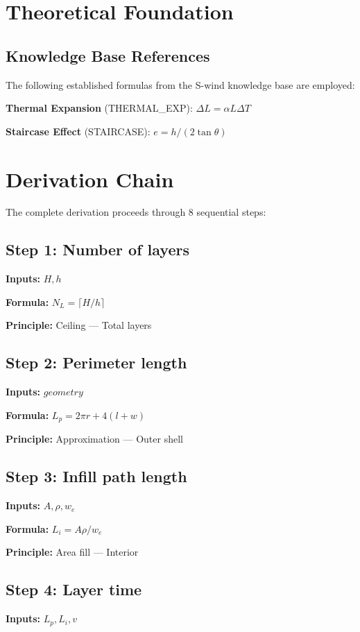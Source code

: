 \documentclass[11pt,twocolumn]{article}
\begin{document}
\section{Theoretical Foundation}

\subsection{Knowledge Base References}
The following established formulas from the S-wind knowledge base are employed:

\textbf{Thermal Expansion} (THERMAL_EXP): $\Delta L = \alpha L \Delta T$ \cite{Thermodynamics}

\textbf{Staircase Effect} (STAIRCASE): $e = h/(2\tan\theta)$ \cite{AM Theory}


\section{Derivation Chain}

The complete derivation proceeds through 8 sequential steps:

\subsection*{Step 1: Number of layers}
\textbf{Inputs:} $H, h$

\textbf{Formula:} $N_L = \lceil H/h \rceil$

\textbf{Principle:} Ceiling --- Total layers

\subsection*{Step 2: Perimeter length}
\textbf{Inputs:} $geometry$

\textbf{Formula:} $L_p = 2\pi r + 4(l+w)$

\textbf{Principle:} Approximation --- Outer shell

\subsection*{Step 3: Infill path length}
\textbf{Inputs:} $A, \rho, w_e$

\textbf{Formula:} $L_i = A \rho / w_e$

\textbf{Principle:} Area fill --- Interior

\subsection*{Step 4: Layer time}
\textbf{Inputs:} $L_p, L_i, v$
\end{document}
